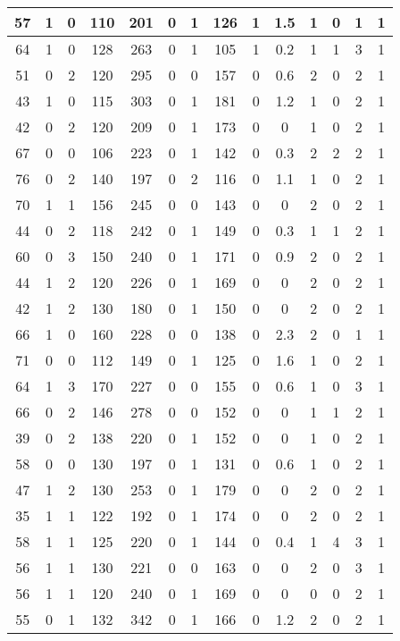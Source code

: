 \documentclass{article}
\begin{document}
\begin{longtable}{|c|c|c|c|c|c|c|c|c|c|c|c|c|c|}
57 & 1 & 0 & 110 & 201 & 0 & 1 & 126 & 1 & 1.5 & 1 & 0 & 1 & 1 \\ \hline
64 & 1 & 0 & 128 & 263 & 0 & 1 & 105 & 1 & 0.2 & 1 & 1 & 3 & 1 \\ \hline
51 & 0 & 2 & 120 & 295 & 0 & 0 & 157 & 0 & 0.6 & 2 & 0 & 2 & 1 \\ \hline
43 & 1 & 0 & 115 & 303 & 0 & 1 & 181 & 0 & 1.2 & 1 & 0 & 2 & 1 \\ \hline
42 & 0 & 2 & 120 & 209 & 0 & 1 & 173 & 0 & 0 & 1 & 0 & 2 & 1 \\ \hline
67 & 0 & 0 & 106 & 223 & 0 & 1 & 142 & 0 & 0.3 & 2 & 2 & 2 & 1 \\ \hline
76 & 0 & 2 & 140 & 197 & 0 & 2 & 116 & 0 & 1.1 & 1 & 0 & 2 & 1 \\ \hline
70 & 1 & 1 & 156 & 245 & 0 & 0 & 143 & 0 & 0 & 2 & 0 & 2 & 1 \\ \hline
44 & 0 & 2 & 118 & 242 & 0 & 1 & 149 & 0 & 0.3 & 1 & 1 & 2 & 1 \\ \hline
60 & 0 & 3 & 150 & 240 & 0 & 1 & 171 & 0 & 0.9 & 2 & 0 & 2 & 1 \\ \hline
44 & 1 & 2 & 120 & 226 & 0 & 1 & 169 & 0 & 0 & 2 & 0 & 2 & 1 \\ \hline
42 & 1 & 2 & 130 & 180 & 0 & 1 & 150 & 0 & 0 & 2 & 0 & 2 & 1 \\ \hline
66 & 1 & 0 & 160 & 228 & 0 & 0 & 138 & 0 & 2.3 & 2 & 0 & 1 & 1 \\ \hline
71 & 0 & 0 & 112 & 149 & 0 & 1 & 125 & 0 & 1.6 & 1 & 0 & 2 & 1 \\ \hline
64 & 1 & 3 & 170 & 227 & 0 & 0 & 155 & 0 & 0.6 & 1 & 0 & 3 & 1 \\ \hline
66 & 0 & 2 & 146 & 278 & 0 & 0 & 152 & 0 & 0 & 1 & 1 & 2 & 1 \\ \hline
39 & 0 & 2 & 138 & 220 & 0 & 1 & 152 & 0 & 0 & 1 & 0 & 2 & 1 \\ \hline
58 & 0 & 0 & 130 & 197 & 0 & 1 & 131 & 0 & 0.6 & 1 & 0 & 2 & 1 \\ \hline
47 & 1 & 2 & 130 & 253 & 0 & 1 & 179 & 0 & 0 & 2 & 0 & 2 & 1 \\ \hline
35 & 1 & 1 & 122 & 192 & 0 & 1 & 174 & 0 & 0 & 2 & 0 & 2 & 1 \\ \hline
58 & 1 & 1 & 125 & 220 & 0 & 1 & 144 & 0 & 0.4 & 1 & 4 & 3 & 1 \\ \hline
56 & 1 & 1 & 130 & 221 & 0 & 0 & 163 & 0 & 0 & 2 & 0 & 3 & 1 \\ \hline
56 & 1 & 1 & 120 & 240 & 0 & 1 & 169 & 0 & 0 & 0 & 0 & 2 & 1 \\ \hline
55 & 0 & 1 & 132 & 342 & 0 & 1 & 166 & 0 & 1.2 & 2 & 0 & 2 & 1 \\ \hline

\end{longtable}
\end{document}
